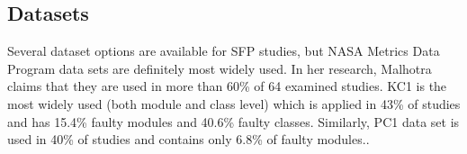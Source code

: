\subsection{Datasets}
Several dataset options are available for SFP studies, but NASA Metrics Data Program data sets are definitely most widely used. In her research, Malhotra claims that they are used in more than 60\% of 64 examined studies. KC1 is the most widely used (both module and class level) which is applied in 43\% of studies and
has 15.4\% faulty modules and 40.6\% faulty classes. Similarly, PC1 data set is used in 40\% of studies and contains only 6.8\% of faulty modules.\cite[p.~17]{malhotra2015systematic}.